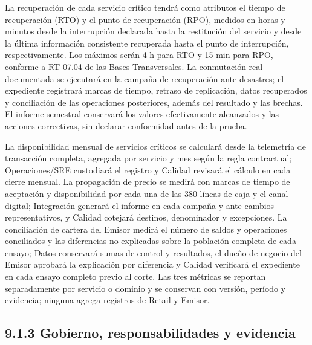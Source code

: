 \documentclass[11pt]{article}
\begin{document}
La recuperación de cada servicio crítico tendrá como atributos el tiempo de recuperación (RTO) y el punto de recuperación (RPO), medidos en horas y minutos desde la interrupción declarada hasta la restitución del servicio y desde la última información consistente recuperada hasta el punto de interrupción, respectivamente. Los máximos serán 4 h para RTO y 15 min para RPO, conforme a RT-07.04 de las Bases Transversales. La conmutación real documentada se ejecutará en la campaña de recuperación ante desastres; el expediente registrará marcas de tiempo, retraso de replicación, datos recuperados y conciliación de las operaciones posteriores, además del resultado y las brechas. El informe semestral conservará los valores efectivamente alcanzados y las acciones correctivas, sin declarar conformidad antes de la prueba.

La disponibilidad mensual de servicios críticos se calculará desde la telemetría de transacción completa, agregada por servicio y mes según la regla contractual; Operaciones/SRE custodiará el registro y Calidad revisará el cálculo en cada cierre mensual. La propagación de precio se medirá con marcas de tiempo de aceptación y disponibilidad por cada una de las 380 líneas de caja y el canal digital; Integración generará el informe en cada campaña y ante cambios representativos, y Calidad cotejará destinos, denominador y excepciones. La conciliación de cartera del Emisor medirá el número de saldos y operaciones conciliados y las diferencias no explicadas sobre la población completa de cada ensayo; Datos conservará sumas de control y resultados, el dueño de negocio del Emisor aprobará la explicación por diferencia y Calidad verificará el expediente en cada ensayo completo previo al corte. Las tres métricas se reportan separadamente por servicio o dominio y se conservan con versión, período y evidencia; ninguna agrega registros de Retail y Emisor.

\subsection{9.1.3 Gobierno, responsabilidades y evidencia}
\end{document}
